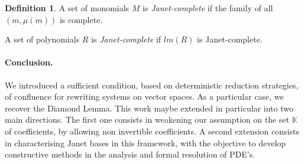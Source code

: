 \documentclass[10pt]{easychair}
\theoremstyle{definition}
\newtheorem{definition}[theorem]{Definition}
\newcommand\K{\mathbb{K}}
\begin{document}
 \begin{definition}
   A set of monomials $M$ is \emph{Janet-complete} if the family of
   all $(m,\mu(m))$ is complete.

   A set of polynomials $R$ is \emph{Janet-complete} if $lm(R)$ is
   Janet-complete.
 \end{definition}

 




 \paragraph{Conclusion.} We introduced a sufficient condition,
 based on deterministic reduction strategies, of confluence for
 rewriting systems on vector spaces. As a particular case,
 we recover the Diamond Lemma. This work maybe extended in particular
 into two main directions. The first one consists in weakening our assumption
 on the set $\K$ of coefficients, by allowing non invertible coefficients.
 A second extension consists in characterising Janet bases in this framework,
 with the objective to develop constructive methods in the analysis and formal
 resolution of PDE's.


\end{document}
